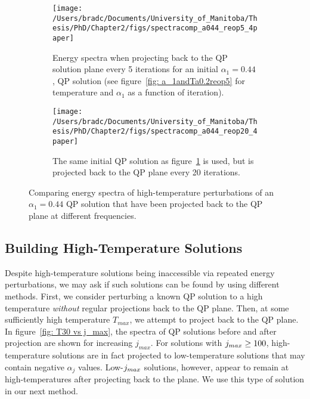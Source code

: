 \documentclass[../PhD.tex]{subfiles}
\begin{document}
\begin{figure}[h]
	\centering
	\begin{subfigure}[t]{0.45\textwidth}
		\texttt{[image: /Users/bradc/Documents/University\_of\_Manitoba/Thesis/PhD/Chapter2/figs/spectracomp\_a044\_reop5\_4paper]}
		\caption{Energy spectra when projecting back to the QP solution plane every 5 iterations for an initial $\alpha_1 = 0.44$, QP solution (see figure~\ref{fig: a_1andTa0.2reop5} for temperature and $\alpha_1$ as a function of iteration).}
		\label{fig: spec comparisons reop5}
	\end{subfigure}
	\:
	\begin{subfigure}[t]{0.45\textwidth}
		\texttt{[image: /Users/bradc/Documents/University\_of\_Manitoba/Thesis/PhD/Chapter2/figs/spectracomp\_a044\_reop20\_4paper]}
		\caption{The same initial QP solution as figure~\ref{fig: spec comparisons reop5} is used, but is projected back to the QP plane every 20 iterations.}
		\label{fig: spec comparisons reop20}
	\end{subfigure}
	\caption[Energy spectra resulting from perturbing the same QP solution at differing frequencies]{Comparing energy spectra of high-temperature perturbations of an $\alpha_1=0.44$ QP solution that have been projected back to the QP plane at different frequencies.}
	\label{fig: spec comps with reop}
\end{figure}



\subsection{Building High-Temperature Solutions}
\label{ssec: by hand highT}

Despite high-temperature solutions being inaccessible via repeated energy perturbations, we may ask if such solutions can be found by using different methods. First, we consider perturbing a known QP solution to a high temperature \emph{without} regular projections back to the QP plane. Then, at some sufficiently high temperature $T_{max}$, we attempt to project back to the QP plane. In figure~\ref{fig: T30 vs j_max}, the spectra of QP solutions before and after projection are shown for increasing $j_{max}$. For solutions with $j_{max} \geq 100$, high-temperature solutions are in fact projected to low-temperature solutions that may contain negative $\alpha_j$ values. Low-$j_{max}$ solutions, however, appear to remain at high-temperatures after projecting back to the plane. We use this type of solution in our next method.
\end{document}
